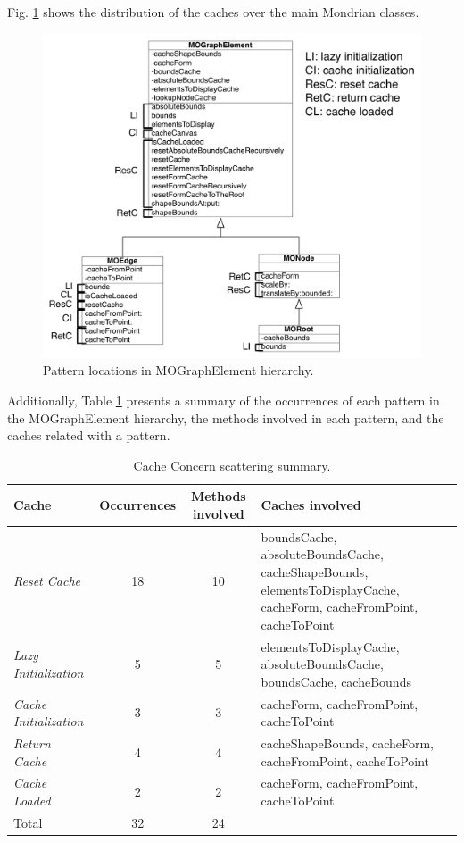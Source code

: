 \documentclass[preprint,10pt]{sigplanconf}
\begin{document}
Fig. \ref{fig:Pattern-locations-in} shows the distribution of the caches over the main Mondrian classes.%
\begin{figure}
\begin{centering}
\includegraphics[bb=186bp 306bp 497bp 644bp,scale=0.9]{PatternLocation} 
\par\end{centering}

\caption{Pattern locations in MOGraphElement hierarchy.\label{fig:Pattern-locations-in}}

\end{figure}


Additionally, Table \ref{tab:Cache-Concern-scattering} presents a
summary of the occurrences of each pattern in the MOGraphElement hierarchy,
the methods involved in each pattern, and the caches related with
a pattern.

%
\begin{table}
\begin{centering}
\begin{tabular}{|p{2.5cm}|c|c|p{3.5cm}|}
\hline 
Cache  & Occurrences  & Methods involved  & Caches involved\tabularnewline
\hline
\hline 
\emph{Reset Cache}  & 18 & 10 & boundsCache, absoluteBoundsCache, cacheShapeBounds, elementsToDisplayCache,
cacheForm, cacheFromPoint, cacheToPoint\tabularnewline
\hline 
\emph{Lazy Initialization}  & 5 & 5 & elementsToDisplayCache, absoluteBoundsCache, boundsCache, cacheBounds\tabularnewline
\hline 
\emph{Cache Initialization}  & 3 & 3 & cacheForm, cacheFromPoint, cacheToPoint\tabularnewline
\hline 
\emph{Return Cache}  & 4 & 4 & cacheShapeBounds, cacheForm, cacheFromPoint, cacheToPoint\tabularnewline
\hline 
\emph{Cache Loaded} & 2 & 2 & cacheForm, cacheFromPoint, cacheToPoint\tabularnewline
\hline 
Total  & 32 & 24 & \multicolumn{1}{c}{}\tabularnewline
\cline{1-3} 
\end{tabular}
\par\end{centering}

\caption{Cache Concern scattering summary.\label{tab:Cache-Concern-scattering}}

\end{table}
\end{document}
